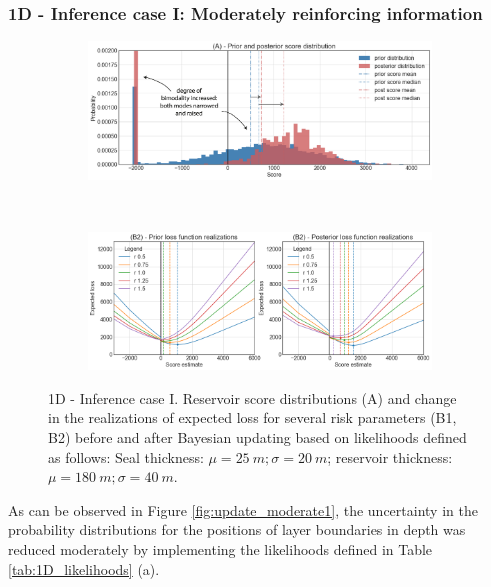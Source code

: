 				\subsubsection{1D - Inference case I: Moderately reinforcing information}
				\begin{figure}[h]
					\begin{subfigure}{1\textwidth}
						\centering
						\includegraphics[width=1\linewidth]{Figures/update_moderate2.png}
					\end{subfigure}%
					\\
					\begin{subfigure}{1\textwidth}
						\centering
						\includegraphics[width=1\linewidth]{Figures/update_moderate3.png}
					\end{subfigure}
					\caption{1D - Inference case I. Reservoir score distributions (A) and change in the realizations of expected loss for several risk parameters (B1, B2) before and after Bayesian updating based on likelihoods defined as follows: Seal thickness: $\mu = 25~m; \sigma = 20~m$; reservoir thickness: $\mu = 180~m; \sigma = 40~m$.}
					\label{fig:update_moderate2_3}
				\end{figure}				
				As can be observed in Figure \ref{fig:update_moderate1}, the uncertainty in the probability distributions for the positions of layer boundaries in depth was reduced moderately by implementing the likelihoods defined in Table \ref{tab:1D_likelihoods} (a).\\					
